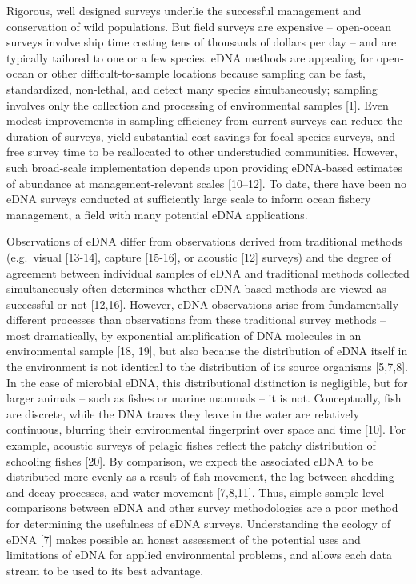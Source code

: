 \documentclass[
]{article}
\begin{document}
Rigorous, well designed surveys underlie the successful management and
conservation of wild populations. But field surveys are expensive -- open-ocean 
surveys involve ship time costing tens of thousands
of dollars per day -- and are typically tailored to one or a few
species. eDNA methods are appealing for open-ocean or other
difficult-to-sample locations because sampling can be fast,
standardized, non-lethal, and detect many species simultaneously; sampling
involves only the collection and processing of environmental samples {[}1{]}.
Even modest improvements in sampling efficiency from current surveys can
reduce the duration of surveys, yield substantial cost savings for focal
species surveys, and free survey time to be reallocated to other
understudied communities. However, such broad-scale implementation
depends upon providing eDNA-based estimates of abundance at
management-relevant scales {[}10--12{]}. To date, there have been no 
eDNA surveys conducted at sufficiently large scale to inform ocean fishery management, 
a field with many potential eDNA applications. 

Observations of eDNA differ from observations derived from traditional
methods (e.g.~visual {[}13-14{]}, capture {[}15-16{]}, or acoustic {[}12{]}
surveys) and the degree of agreement between individual samples of eDNA
and traditional methods collected simultaneously often determines
whether eDNA-based methods are viewed as successful or not {[}12,16{]}.
However, eDNA observations arise from fundamentally different processes
than observations from these traditional survey methods -- most
dramatically, by exponential amplification of DNA molecules in an
environmental sample {[}18, 19{]}, but also because the distribution of eDNA
itself in the environment is not identical to the distribution of its
source organisms {[}5,7,8{]}. In the case of microbial eDNA, this
distributional distinction is negligible, but for larger animals -- such
as fishes or marine mammals -- it is not. Conceptually, fish are
discrete, while the DNA traces they leave in the water are relatively continuous,
blurring their environmental fingerprint over space and time {[}10{]}. For
example, acoustic surveys of pelagic fishes reflect the
patchy distribution of schooling fishes {[}20{]}. By comparison,
we expect the associated eDNA to be distributed more evenly as a result
of fish movement, the lag between shedding and decay processes, and 
water movement {[}7,8,11{]}. Thus, simple sample-level comparisons between  
eDNA and other survey methodologies are a poor method for determining 
the usefulness of eDNA surveys. Understanding the ecology of eDNA {[}7{]} 
makes possible an honest assessment of the potential uses and limitations of eDNA for applied environmental
problems, and allows each data stream to be used to its best advantage.
\end{document}

